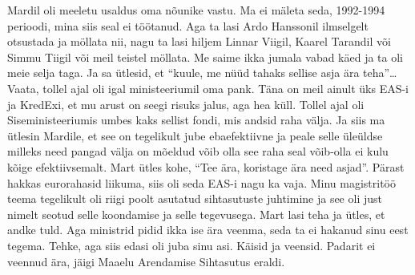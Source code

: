 
Mardil oli meeletu usaldus oma nõunike vastu. Ma ei mäleta seda, 1992-1994 
perioodi, mina siis seal ei töötanud. Aga ta lasi Ardo 
Hanssonil ilmselgelt otsustada ja möllata nii, nagu 
ta lasi hiljem Linnar Viigil, Kaarel 
Tarandil või Simmu Tiigil 
või meil teistel möllata. Me saime ikka jumala vabad käed ja ta oli meie selja 
taga. Ja sa ütlesid, et \enquote{kuule, me nüüd tahaks sellise asja ära 
teha}\ldots Vaata, tollel ajal oli igal ministeeriumil oma pank. Täna on meil 
ainult üks EAS-i ja KredExi, et mu arust on  seegi risuks jalus, aga hea küll. 
Tollel ajal oli Siseministeeriumis umbes kaks sellist fondi, mis andsid raha 
välja. Ja siis ma ütlesin Mardile, et see on tegelikult jube ebaefektiivne ja 
peale selle üleüldse milleks need pangad välja on mõeldud võib olla see raha 
seal võib-olla ei kulu kõige efektiivsemalt. Mart ütles kohe, \enquote{Tee ära, 
koristage ära need asjad}. Pärast hakkas eurorahasid liikuma, siis oli seda 
EAS-i nagu ka vaja. Minu magistritöö teema tegelikult oli riigi poolt asutatud 
sihtasutuste juhtimine ja see oli just nimelt seotud selle koondamise ja selle 
tegevusega. Mart lasi teha ja ütles, et andke tuld. Aga ministrid pidid ikka 
ise ära veenma, seda ta ei hakanud sinu eest tegema. Tehke, aga siis edasi oli 
juba sinu asi. Käisid ja veensid. Padarit ei veennud ära, jäigi Maaelu 
Arendamise Sihtasutus eraldi.


